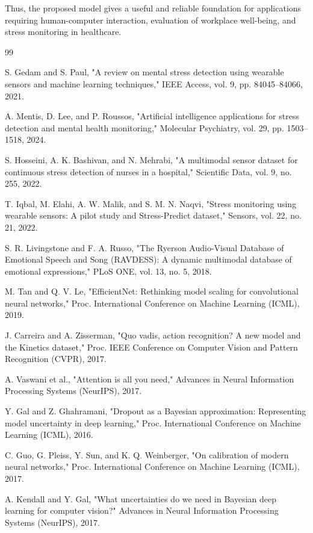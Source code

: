 \documentclass[conference]{IEEEtran}
\begin{document}
Thus, the proposed model gives a useful and reliable foundation for applications requiring human-computer interaction, evaluation of workplace well-being, and stress monitoring in healthcare.

\begin{thebibliography}{99}

S. Gedam and S. Paul,
"A review on mental stress detection using wearable sensors and machine learning techniques,"
IEEE Access, vol. 9, pp. 84045–84066, 2021.

A. Mentis, D. Lee, and P. Roussos,
"Artificial intelligence applications for stress detection and mental health monitoring,"
Molecular Psychiatry, vol. 29, pp. 1503–1518, 2024.

S. Hosseini, A. K. Bashivan, and N. Mehrabi,
"A multimodal sensor dataset for continuous stress detection of nurses in a hospital,"
Scientific Data, vol. 9, no. 255, 2022.

T. Iqbal, M. Elahi, A. W. Malik, and S. M. N. Naqvi,
"Stress monitoring using wearable sensors: A pilot study and Stress-Predict dataset,"
Sensors, vol. 22, no. 21, 2022.

S. R. Livingstone and F. A. Russo,
"The Ryerson Audio-Visual Database of Emotional Speech and Song (RAVDESS): A dynamic multimodal database of emotional expressions,"
PLoS ONE, vol. 13, no. 5, 2018.

M. Tan and Q. V. Le,
"EfficientNet: Rethinking model scaling for convolutional neural networks,"
Proc. International Conference on Machine Learning (ICML), 2019.

J. Carreira and A. Zisserman,
"Quo vadis, action recognition? A new model and the Kinetics dataset,"
Proc. IEEE Conference on Computer Vision and Pattern Recognition (CVPR), 2017.

A. Vaswani et al.,
"Attention is all you need,"
Advances in Neural Information Processing Systems (NeurIPS), 2017.

Y. Gal and Z. Ghahramani,
"Dropout as a Bayesian approximation: Representing model uncertainty in deep learning,"
Proc. International Conference on Machine Learning (ICML), 2016.

C. Guo, G. Pleiss, Y. Sun, and K. Q. Weinberger,
"On calibration of modern neural networks,"
Proc. International Conference on Machine Learning (ICML), 2017.

A. Kendall and Y. Gal,
"What uncertainties do we need in Bayesian deep learning for computer vision?"
Advances in Neural Information Processing Systems (NeurIPS), 2017.


\end{thebibliography}
\end{document}
